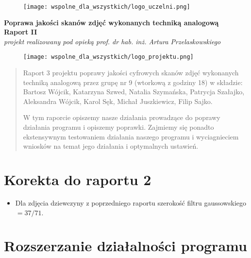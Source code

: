 \documentclass[]{mwart}
\begin{document}
\thispagestyle{empty}

\begin{figure}[h]
    \centering
    \texttt{[image: wspolne\_dla\_wszystkich/logo\_uczelni.png]}
\end{figure}


\begin{center}
    {\LARGE \textbf{Poprawa jakości skanów zdjęć wykonanych techniką analogową
        }} \\[0.3cm]
    {\large \textbf{Raport II}} \\[0.2cm]
    \textit{projekt realizowany pod opieką prof. dr hab. inż. Artura Przelaskowskiego}

\end{center}

\begin{figure}[h]
    \centering
    \texttt{[image: wspolne\_dla\_wszystkich/logo\_projektu.png]}
\end{figure}

\vfill
\begin{abstract}
    Raport 3 projektu poprawy jakości cyfrowych skanów zdjęć wykonanych techniką analogową przez grupę nr 9 (wtorkową z godziny 18)
    w składzie:  Bartosz Wójcik, Katarzyna Szwed, Natalia Szymańska,
    Patrycja Szałajko, Aleksandra Wójcik, Karol Sęk, Michał Juszkiewicz, Filip Sajko.

    W tym raporcie opiszemy nasze działania prowadzące do poprawy działania programu i opiszemy poprawki.
    Zajmiemy się ponadto ekstensywnym testowaniem działania naszego programu i wyciagnieciem wniosków na temat jego działania i optymalnych ustawień.
\end{abstract}

\newpage
\tableofcontents{}

\newpage

\section{Korekta do raportu 2}
\begin{itemize}
    \item Dla zdjęcia dziewczyny z poprzedniego raportu szerokość filtru gaussowskiego $ =  37/71$.
\end{itemize}


\section{Rozszerzanie działalności programu}
\end{document}
